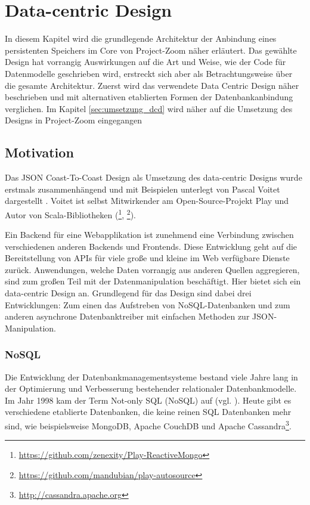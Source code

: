 
\section{Data-centric Design}
\label{sec:dcd}
In diesem Kapitel wird die grundlegende Architektur der Anbindung eines persistenten Speichers im Core von Project-Zoom näher erläutert. Das gewählte Design hat vorrangig Auswirkungen auf die Art und Weise, wie der Code für Datenmodelle geschrieben wird, erstreckt sich aber als Betrachtungsweise über die gesamte Architektur. Zuerst wird das verwendete Data Centric Design näher beschrieben und mit alternativen etablierten Formen der Datenbankanbindung verglichen. Im Kapitel \ref{sec:umsetzung_dcd} wird näher auf die Umsetzung des Designs in Project-Zoom eingegangen

\subsection{Motivation}
\label{sec:dcdmotivation}
Das JSON Coast-To-Coast Design als Umsetzung des data-centric Designs wurde erstmals zusammenhängend und mit Beispielen unterlegt von Pascal Voitet dargestellt \cite{jctc}. Voitet ist selbst Mitwirkender am Open-Source-Projekt Play und Autor von Scala-Bibliotheken (\footnote{\url{ https://github.com/zenexity/Play-ReactiveMongo}}, \footnote{\url{ https://github.com/mandubian/play-autosource}}). 

Ein Backend für eine Webapplikation ist zunehmend eine Verbindung zwischen verschiedenen anderen Backends und Frontends. Diese Entwicklung geht auf die Bereitstellung von APIs für viele große und kleine im Web verfügbare Dienste zurück. Anwendungen, welche Daten vorrangig aus anderen Quellen aggregieren, sind zum großen Teil mit der Datenmanipulation beschäftigt. Hier bietet sich ein data-centric Design an. Grundlegend für das Design sind dabei drei Entwicklungen: Zum einen das Aufstreben von NoSQL-Datenbanken und zum anderen asynchrone Datenbanktreiber mit einfachen Methoden zur JSON-Manipulation.

\subsubsection{NoSQL}
Die Entwicklung der Datenbankmanagementsysteme bestand viele Jahre lang in der Optimierung und Verbesserung bestehender relationaler Datenbankmodelle. Im Jahr 1998 kam der Term Not-only SQL (NoSQL) auf (vgl. \cite{storage-solutions}). Heute gibt es verschiedene etablierte Datenbanken, die keine reinen SQL Datenbanken mehr sind, wie beispielsweise MongoDB, Apache CouchDB und Apache Cassandra\footnote{\url{http://cassandra.apache.org}}.

